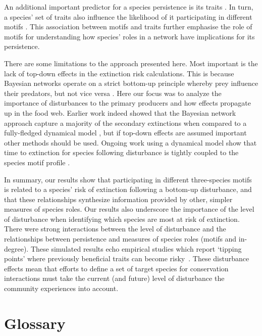 \documentclass[12pt]{article}
\begin{document}
\begin{spacing}{2.0}
An additional important predictor for a species persistence is its traits \citep{Brose2017, curtsdotter2011robustness, Cardillo2005, Purvis2000}. In turn, a species' set of traits also influence the likelihood of it participating in different motifs \citep{cirtwill2018feeding}. This association between motifs and traits further emphasise the role of motifs for understanding how species' roles in a network have implications for its persistence. 

There are some limitations to the approach presented here. Most important is the lack of top-down effects in the extinction risk calculations. This is because Bayesian networks operate on a strict bottom-up principle whereby prey influence their predators, but not vice versa \citep{Eklof2013}. Here our focus was to analyze the importance of disturbances to the primary producers and how effects propagate up in the food web. Earlier work indeed showed that the Bayesian network approach capture a majority of the secondary extinctions when compared to a fully-fledged dynamical model \citep{Eklof2013}, but if top-down effects are assumed important other methods should be used. Ongoing work using a dynamical model show that time to extinction for species following disturbance is tightly coupled to the species motif profile \citep{Cirtwill2021_inprep}. 

In summary, our results show that participating in different three-species motifs is related to a species' risk of extinction following a bottom-up disturbance, and that these relationships synthesize information provided by other, simpler measures of species roles.
Our results also underscore the importance of the level of disturbance when identifying which species are most at risk of extinction.
There were strong interactions between the level of disturbance and the relationships between persistence and measures of species roles (motifs and in-degree).
These simulated results echo empirical studies which report `tipping points' where previously beneficial traits can become risky~\citep{}.
These disturbance effects mean that efforts to define a set of target species for conservation interactions must take the current (and future) level of disturbance the community experiences into account.


\clearpage    

\section*{Glossary}


\end{spacing}
\end{document}
